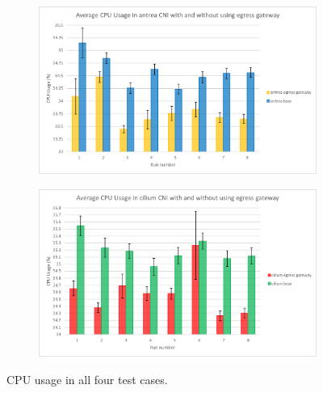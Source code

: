 \begin{figure}[H]
    \begin{subfigure}[b]{0.35\textwidth}
        \includegraphics[width=\textwidth]{plots/small/cpu_antrea.png}
        \caption{}
        \label{fig:cpu_c}
    \end{subfigure}
    \hfill
    \begin{subfigure}[b]{0.35\textwidth}
        \includegraphics[width=\textwidth]{plots/small/cpu_cilium.png}
        \caption{}
        \label{fig:cpu_d}
    \end{subfigure}
    
    \caption{CPU usage in all four test cases.}
    \label{fig:cpuFour}
\end{figure}

